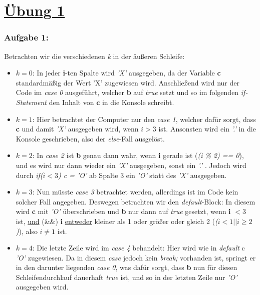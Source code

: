 \documentclass{article}
\begin{document}
\section*{\underline{Übung 1}}
    \subsubsection*{Aufgabe 1:}

    Betrachten wir die verschiedenen \emph{k} in der äußeren Schleife:
    \begin{itemize}
        \item $k = 0$: \newline
        In jeder \textbf{i}-ten Spalte wird \emph{'X'} ausgegeben, da der Variable \textbf{c} standardmäßig der Wert 'X' zugewiesen wird.
        Anschließend wird nur der Code im \emph{case 0} ausgeführt, welcher \textbf{b} auf \textit{true} setzt und so im folgenden \emph{if-Statement} den Inhalt von \textbf{c} in die Konsole schreibt.
        \item $k = 1$: \newline
        Hier betrachtet der Computer nur den \emph{case 1}, welcher dafür sorgt, dass \textbf{c} und damit \emph{'X'} ausgegeben wird, wenn $i > 3$ ist.
        Ansonsten wird ein \emph{'.'} in die Konsole geschrieben, also der \emph{else}-Fall ausgelöst.
        \item $k = 2$: \newline
        In \emph{case 2} ist \textbf{b} genau dann wahr, wenn \textbf{i} gerade ist (\textit{(i \% 2) == 0}), und es wird nur dann wieder ein \emph{'X'} ausgegeben,
        sonst ein \emph{'.'} . Jedoch wird durch \emph{if($i < 3$) c = 'O'} ab Spalte 3 ein \emph{'O'} statt des \emph{'X'} ausgegeben.
        \item $k = 3$: \newline
        Nun müsste \emph{case 3} betrachtet werden, allerdings ist im Code kein solcher Fall angegeben. Deswegen betrachten wir den \emph{default}-Block:
        In diesem wird \textbf{c} mit \emph{'O'} überschrieben und \textbf{b} nur dann auf \emph{true} gesetzt, wenn \textbf{i} $< 3$ ist, \underline{und} (\&\&)
        \textbf{i} \underline{entweder} kleiner als 1 oder größer oder gleich 2 (\textit{($i < 1 || i \geq 2$)}), also $i \neq 1$ ist.
        \item $k = 4$: \newline
        Die letzte Zeile wird im \emph{case 4} behandelt: Hier wird wie in \emph{default} c \emph{'O'} zugewiesen. Da in diesem \emph{case} jedoch kein \textit{break;} vorhanden
        ist, springt er in den darunter liegenden \emph{case 0}, was dafür sorgt, dass \textbf{b} nun für diesen Schleifendurchlauf dauerhaft \emph{true} ist, und so
        in der letzten Zeile nur \emph{'O'} ausgegeben wird.
    \end{itemize}
\end{document}

